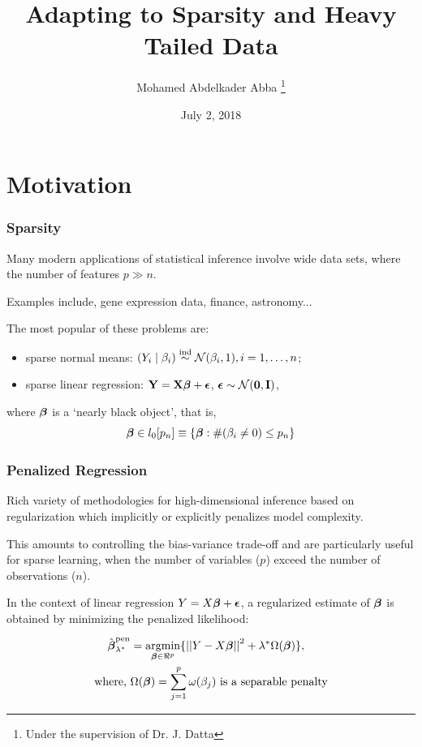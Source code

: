 \documentclass[10pt]{beamer}
\title[Adapting to Sparsity and Heavy Tailed Data]{Adapting to Sparsity and Heavy Tailed Data}
\author{Mohamed Abdelkader Abba \thanks{Under the supervision of Dr. J. Datta }}
\institute[UArkansas]{University of Arkansas, Department of Mathematical Sciences}
\date{July 2, 2018}
\theoremstyle{plain}
\begin{document}
\begin{frame}
\titlepage
\end{frame}

\tableofcontents

\section{Motivation}

\begin{frame}
\frametitle{Sparsity}
Many modern applications of statistical inference involve wide data sets, where the number of features $p \gg n$. 

Examples include, gene expression data, finance, astronomy...

The most popular of these problems are: 
\begin{itemize}
	\item sparse normal means: $(Y_i \mid \beta_i)  \stackrel{\mathrm{ind}}{\sim} \mathcal{N} (\beta_i,1), i = 1, \dots, n$;
	\item sparse linear regression: ${\bf Y} = {\bf X} \boldsymbol{\beta} + \boldsymbol{\epsilon}$, $\boldsymbol{\epsilon} \sim \mathcal{N}({\bf 0}, {\bf I})$, 
\end{itemize}
where $\boldsymbol{\beta}$ is a `nearly black object', that is, 
\[
\boldsymbol{\beta} \in l_0 [ p_n] \equiv \{ \boldsymbol{\beta} : \# ( \beta_i \neq 0 ) \leq p_n \}
\]

\end{frame}

\begin{frame}
\frametitle{Penalized Regression}
\bit
\item Rich variety of methodologies for high-dimensional inference based on regularization which implicitly or explicitly penalizes model complexity. 

\item This amounts to controlling the bias-variance trade-off and are particularly useful for sparse learning, when the number of variables ($p$) exceed the number of observations ($n$). 

\item In the context of linear regression $Y = X \boldsymbol{\beta} + \boldsymbol{\epsilon}$, a regularized estimate of $\boldsymbol{\beta}$ is obtained by minimizing the penalized likelihood:
\eit 

\begin{align}
\hat{\bbeta}_{\lambda^*}^{\text{pen}} & = \argmin_{\bbeta \in \Re^p} \{ \vectornorm{Y - X\bbeta}^2 + \lambda^* \Omega(\bbeta) \}, \label{eq:penalize} \\
  \text{where, } & \Omega(\bbeta) = \sum_{j=1}^{p} \omega(\beta_j) \text{ is a separable penalty}
\end{align}


\end{frame}
\end{document}
